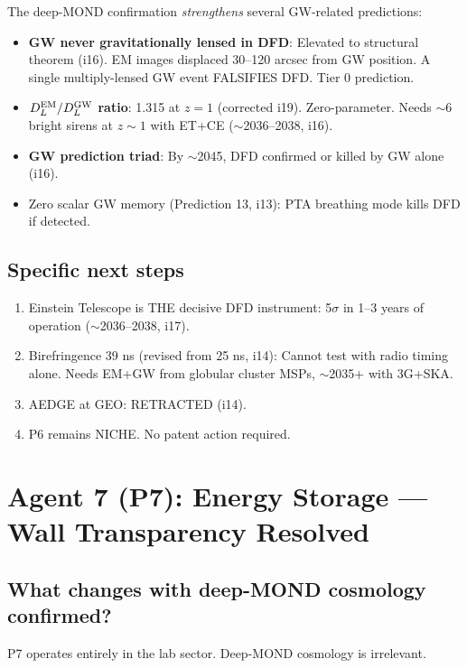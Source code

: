 \documentclass[11pt]{article}
\begin{document}
The deep-MOND confirmation \emph{strengthens} several GW-related predictions:
\begin{itemize}
\item \textbf{GW never gravitationally lensed in DFD}: Elevated to structural theorem (i16).
EM images displaced 30--120 arcsec from GW position. A single multiply-lensed GW event
FALSIFIES DFD. Tier 0 prediction.
\item \textbf{$D_L^{\rm EM}/D_L^{\rm GW}$ ratio}: 1.315 at $z = 1$ (corrected i19).
Zero-parameter. Needs $\sim$6 bright sirens at $z \sim 1$ with ET+CE ($\sim$2036--2038, i16).
\item \textbf{GW prediction triad}: By $\sim$2045, DFD confirmed or killed by GW alone (i16).
\item Zero scalar GW memory (Prediction 13, i13): PTA breathing mode kills DFD if detected.
\end{itemize}

\subsection{Specific next steps}
\begin{enumerate}
\item Einstein Telescope is THE decisive DFD instrument: 5$\sigma$ in 1--3 years of
operation ($\sim$2036--2038, i17).
\item Birefringence 39 ns (revised from 25 ns, i14): Cannot test with radio timing alone.
Needs EM+GW from globular cluster MSPs, $\sim$2035+ with 3G+SKA.
\item AEDGE at GEO: RETRACTED (i14).
\item P6 remains NICHE. No patent action required.
\end{enumerate}

\newpage
\section{Agent 7 (P7): Energy Storage --- Wall Transparency Resolved}
\label{sec:agent7}

\subsection{What changes with deep-MOND cosmology confirmed?}

P7 operates entirely in the lab sector. Deep-MOND cosmology is irrelevant.
\end{document}
